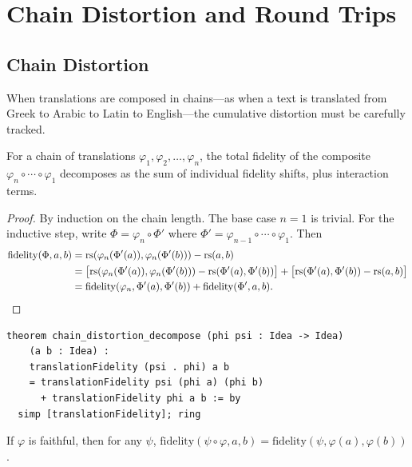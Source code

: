 \section{Chain Distortion and Round Trips}
\label{sec:translation:chains}

\subsection{Chain Distortion}

When translations are composed in chains---as when a text is translated
from Greek to Arabic to Latin to English---the cumulative distortion must
be carefully tracked.

\begin{theorem}
\label{thm:chain-distortion}
For a chain of translations $\varphi_1, \varphi_2, \ldots, \varphi_n$,
the total fidelity of the composite $\varphi_n \circ \cdots \circ \varphi_1$
decomposes as the sum of individual fidelity shifts, plus interaction terms.
\end{theorem}

\begin{proof}
By induction on the chain length.  The base case $n = 1$ is trivial.  For
the inductive step, write $\Phi = \varphi_n \circ \Phi'$ where
$\Phi' = \varphi_{n-1} \circ \cdots \circ \varphi_1$.  Then
\begin{align*}
  \mathrm{fidelity}(\Phi, a, b)
    &= \mathrm{rs}(\varphi_n(\Phi'(a)), \varphi_n(\Phi'(b))) - \mathrm{rs}(a, b) \\
    &= \bigl[\mathrm{rs}(\varphi_n(\Phi'(a)), \varphi_n(\Phi'(b)))
       - \mathrm{rs}(\Phi'(a), \Phi'(b))\bigr]
       + \bigl[\mathrm{rs}(\Phi'(a), \Phi'(b)) - \mathrm{rs}(a, b)\bigr] \\
    &= \mathrm{fidelity}(\varphi_n, \Phi'(a), \Phi'(b))
       + \mathrm{fidelity}(\Phi', a, b).
\end{align*}
\end{proof}

\begin{lstlisting}
theorem chain_distortion_decompose (phi psi : Idea -> Idea)
    (a b : Idea) :
    translationFidelity (psi . phi) a b
    = translationFidelity psi (phi a) (phi b)
      + translationFidelity phi a b := by
  simp [translationFidelity]; ring
\end{lstlisting}

\begin{theorem}
\label{thm:chain-faithful-first}
If $\varphi$ is faithful, then for any $\psi$,
$\mathrm{fidelity}(\psi \circ \varphi, a, b) =
 \mathrm{fidelity}(\psi, \varphi(a), \varphi(b))$.
\end{theorem}

